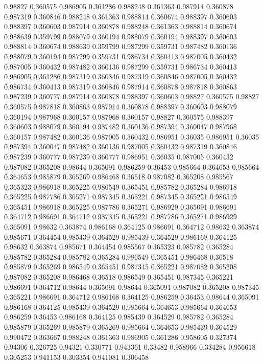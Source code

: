 0.98827 0.360575
0.986905 0.361286
0.988248 0.361363
0.987914 0.360878
0.987319 0.360846
0.988248 0.361363
0.988814 0.360674
0.988397 0.360603
0.988397 0.360603
0.987914 0.360878
0.988248 0.361363
0.988814 0.360674
0.988639 0.359799
0.988079 0.360194
0.988079 0.360194
0.988397 0.360603
0.988814 0.360674
0.988639 0.359799
0.987299 0.359731
0.987482 0.360136
0.988079 0.360194
0.987299 0.359731
0.986734 0.360413
0.987005 0.360432
0.987005 0.360432
0.987482 0.360136
0.987299 0.359731
0.986734 0.360413
0.986905 0.361286
0.987319 0.360846
0.987319 0.360846
0.987005 0.360432
0.986734 0.360413
0.987319 0.360846
0.987914 0.360878
0.987818 0.360863
0.987239 0.360777
0.987914 0.360878
0.988397 0.360603
0.98827 0.360575
0.98827 0.360575
0.987818 0.360863
0.987914 0.360878
0.988397 0.360603
0.988079 0.360194
0.987968 0.360157
0.987968 0.360157
0.98827 0.360575
0.988397 0.360603
0.988079 0.360194
0.987482 0.360136
0.987394 0.360047
0.987968 0.360157
0.987482 0.360136
0.987005 0.360432
0.986951 0.36035
0.986951 0.36035
0.987394 0.360047
0.987482 0.360136
0.987005 0.360432
0.987319 0.360846
0.987239 0.360777
0.987239 0.360777
0.986951 0.36035
0.987005 0.360432
0.987082 0.365208
0.98644 0.365091
0.986259 0.36453
0.985664 0.364653
0.985664 0.364653
0.985879 0.365269
0.986468 0.36518
0.987082 0.365208
0.985567 0.365323
0.986918 0.365225
0.986549 0.365451
0.985782 0.365284
0.986918 0.365225
0.987786 0.365271
0.987345 0.365221
0.987345 0.365221
0.986549 0.365451
0.986918 0.365225
0.987786 0.365271
0.986929 0.365091
0.986691 0.364712
0.986691 0.364712
0.987345 0.365221
0.987786 0.365271
0.986929 0.365091
0.98632 0.363874
0.986168 0.364125
0.986691 0.364712
0.98632 0.363874
0.985671 0.364454
0.985439 0.364529
0.985439 0.364529
0.986168 0.364125
0.98632 0.363874
0.985671 0.364454
0.985567 0.365323
0.985782 0.365284
0.985782 0.365284
0.985782 0.365284
0.986549 0.365451
0.986468 0.36518
0.985879 0.365269
0.986549 0.365451
0.987345 0.365221
0.987082 0.365208
0.987082 0.365208
0.986468 0.36518
0.986549 0.365451
0.987345 0.365221
0.986691 0.364712
0.98644 0.365091
0.98644 0.365091
0.987082 0.365208
0.987345 0.365221
0.986691 0.364712
0.986168 0.364125
0.986259 0.36453
0.98644 0.365091
0.986168 0.364125
0.985439 0.364529
0.985664 0.364653
0.985664 0.364653
0.986259 0.36453
0.986168 0.364125
0.985439 0.364529
0.985782 0.365284
0.985879 0.365269
0.985879 0.365269
0.985664 0.364653
0.985439 0.364529
0.990472 0.363667
0.988248 0.361363
0.986905 0.361286
0.958605 0.327374
0.94306 0.326725
0.94321 0.330771
0.943361 0.33482
0.958966 0.334284
0.956618 0.305253
0.941153 0.303354
0.941081 0.306458

